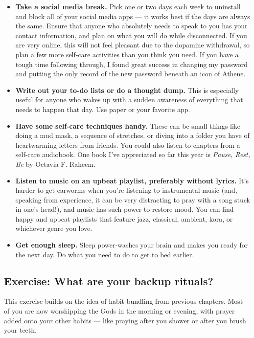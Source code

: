 \documentclass[
]{book}
\providecommand{\tightlist}{%
  \setlength{\itemsep}{0pt}\setlength{\parskip}{0pt}}
\begin{document}
\begin{itemize}
\tightlist
\item
  \textbf{Take a social media break.} Pick one or two days each week to uninstall and block all of your social media apps --- it works best if the days are always the same. Ensure that anyone who absolutely needs to speak to you has your contact information, and plan on what you will do while disconnected. If you are very online, this will not feel pleasant due to the dopamine withdrawal, so plan a few more self-care activities than you think you need. If you have a tough time following through, I found great success in changing my password and putting the only record of the new password beneath an icon of Athene.
\item
  \textbf{Write out your to-do lists or do a thought dump.} This is especially useful for anyone who wakes up with a sudden awareness of everything that needs to happen that day. Use paper or your favorite app.
\item
  \textbf{Have some self-care techniques handy.} These can be small things like doing a mud mask, a sequence of stretches, or diving into a folder you have of heartwarming letters from friends. You could also listen to chapters from a self-care audiobook. One book I've appreciated so far this year is \emph{Pause, Rest, Be} by Octavia F. Raheem.
\item
  \textbf{Listen to music on an upbeat playlist, preferably without lyrics.} It's harder to get earworms when you're listening to instrumental music (and, speaking from experience, it can be very distracting to pray with a song stuck in one's head!), and music has such power to restore mood. You can find happy and upbeat playlists that feature jazz, classical, ambient, kora, or whichever genre you love.
\item
  \textbf{Get enough sleep.} Sleep power-washes your brain and makes you ready for the next day. Do what you need to do to get to bed earlier.
\end{itemize}

\hypertarget{exercise-what-are-your-backup-rituals}{%
\subsection{Exercise: What are your backup rituals?}\label{exercise-what-are-your-backup-rituals}}

This exercise builds on the idea of habit-bundling from previous chapters. Most of you are now worshipping the Gods in the morning or evening, with prayer added onto your other habits --- like praying after you shower or after you brush your teeth.
\end{document}
